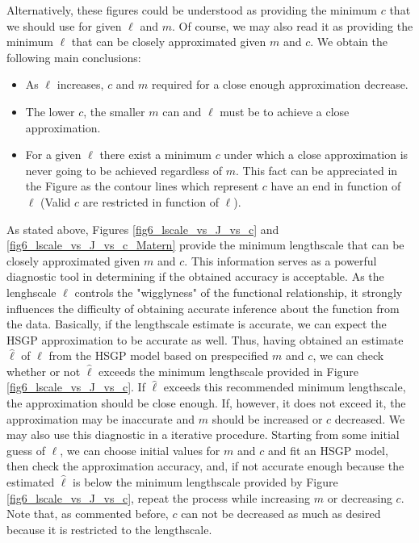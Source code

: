 \documentclass[onecolumn,a4paper,11pt]{article}
\begin{document}
\noindent Alternatively, these figures could be understood as providing the minimum $c$ that we should use for given $\ell$ and $m$. Of course, we may also read it as providing the minimum $\ell$ that can be closely approximated given $m$ and $c$. We obtain the following main conclusions:

\begin{itemize}
\item As $\ell$ increases, $c$ and $m$ required for a close enough approximation decrease.
\item The lower $c$, the smaller $m$ can and $\ell$ must be to achieve a close approximation.
\item For a given $\ell$ there exist a minimum $c$ under which a close approximation is never going to be achieved regardless of $m$. This fact can be appreciated in the Figure as the contour lines which represent $c$ have an end in function of $\ell$ (Valid $c$ are restricted in function of $\ell$).
\end{itemize}

As stated above, Figures \ref{fig6_lscale_vs_J_vs_c} and \ref{fig6_lscale_vs_J_vs_c_Matern} provide the minimum lengthscale that can be closely approximated given $m$ and $c$. This information serves as a powerful diagnostic tool in determining if the obtained accuracy is acceptable. As the lenghscale $\ell$ controls the "wigglyness" of
the functional relationship, it strongly influences the difficulty of obtaining accurate
inference about the function from the data. Basically, if the lengthscale estimate is accurate, 
we can expect the HSGP approximation to be accurate as well. Thus, having obtained an estimate $\hat{\ell}$ of $\ell$ from the HSGP model based on prespecified $m$ and $c$, we can check whether or not $\hat{\ell}$ exceeds the minimum lengthscale provided in Figure \ref{fig6_lscale_vs_J_vs_c}. If $\hat{\ell}$ exceeds this recommended minimum lengthscale, the approximation should be close enough. If, however, it does not exceed it, the approximation may be inaccurate and $m$ should be increased or $c$ decreased. We may also use this diagnostic in a iterative procedure.
Starting from some initial guess of $\ell$, we can choose initial values for $m$ and $c$ and fit an HSGP model, then check the approximation accuracy, and, if not accurate enough because the estimated $\hat{\ell}$ is below the minimum lengthscale provided by Figure \ref{fig6_lscale_vs_J_vs_c}, repeat the process while increasing $m$ or decreasing $c$. Note that, as commented before, $c$ can not be decreased as much as desired because it is restricted to the lengthscale.
\end{document}

